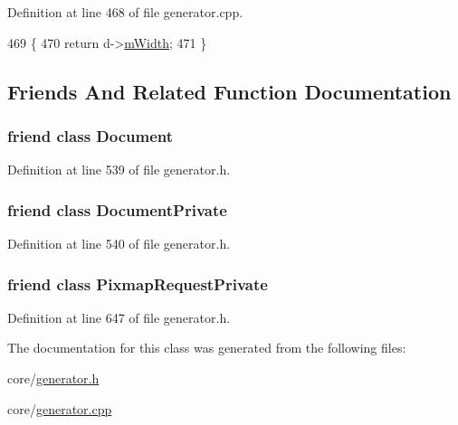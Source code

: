 Definition at line 468 of file generator.\+cpp.


\begin{DoxyCode}
469 \{
470     \textcolor{keywordflow}{return} d->\hyperlink{classOkular_1_1PixmapRequestPrivate_a7b18925fda75ddbca63144cd1f31a096}{mWidth};
471 \}
\end{DoxyCode}


\subsection{Friends And Related Function Documentation}
\hypertarget{classOkular_1_1PixmapRequest_a883538034e58fc5c0de7d4e4cab3cef7}{
\subsubsection[{Document}]{\setlength{\rightskip}{0pt plus 5cm}friend class {\bf Document}\hspace{0.3cm}{\ttfamily [friend]}}}\label{classOkular_1_1PixmapRequest_a883538034e58fc5c0de7d4e4cab3cef7}


Definition at line 539 of file generator.\+h.

\hypertarget{classOkular_1_1PixmapRequest_ad60d3d11afe13773e689a27dbaba5d11}{
\subsubsection[{Document\+Private}]{\setlength{\rightskip}{0pt plus 5cm}friend class {\bf Document\+Private}\hspace{0.3cm}{\ttfamily [friend]}}}\label{classOkular_1_1PixmapRequest_ad60d3d11afe13773e689a27dbaba5d11}


Definition at line 540 of file generator.\+h.

\hypertarget{classOkular_1_1PixmapRequest_ace334a3617b227e88359744b00f9085c}{
\subsubsection[{Pixmap\+Request\+Private}]{\setlength{\rightskip}{0pt plus 5cm}friend class {\bf Pixmap\+Request\+Private}\hspace{0.3cm}{\ttfamily [friend]}}}\label{classOkular_1_1PixmapRequest_ace334a3617b227e88359744b00f9085c}


Definition at line 647 of file generator.\+h.



The documentation for this class was generated from the following files\+:\begin{DoxyCompactItemize}
\item 
core/\hyperlink{generator_8h}{generator.\+h}\item 
core/\hyperlink{generator_8cpp}{generator.\+cpp}\end{DoxyCompactItemize}
